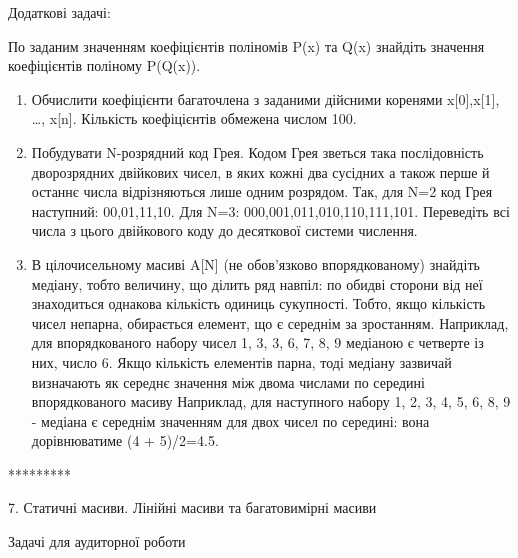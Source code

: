 \documentclass[]{article}
\begin{document}
Додаткові задачі:

По заданим значенням коефіцієнтів поліномів P(x) та Q(x) знайдіть
значення коефіцієнтів поліному P(Q(x)).

\begin{enumerate}
\def\labelenumi{\arabic{enumi})}
\setcounter{enumi}{12}
\item
  Обчислити коефіцієнти багаточлена з заданими дійсними коренями
  x{[}0{]},x{[}1{]}, \ldots{}, x{[}n{]}. Кількість коефіцієнтів обмежена
  числом 100.
\item
  Побудувати N-розрядний код Грея. Кодом Грея зветься така послідовність
  дворозрядних двійкових чисел, в яких кожні два сусідних а також перше
  й останнє числа відрізняються лише одним розрядом. Так, для N=2 код
  Грея наступний: 00,01,11,10. Для N=3: 000,001,011,010,110,111,101.
  Переведіть всі числа з цього двійкового коду до десяткової системи
  числення.
\item
  В цілочисельному масиві A{[}N{]} (не обов'язково впорядкованому)
  знайдіть медіану, тобто величину, що ділить ряд навпіл: по обидві
  сторони від неї знаходиться однакова кількість одиниць сукупності.
  Тобто, якщо кількість чисел непарна, обирається елемент, що є середнім
  за зростанням. Наприклад, для впорядкованого набору чисел 1, 3, 3, 6,
  7, 8, 9 медіаною є четверте із них, число 6. Якщо кількість елементів
  парна, тоді медіану зазвичай визначають як середнє значення між двома
  числами по середині впорядкованого масиву Наприклад, для наступного
  набору 1, 2, 3, 4, 5, 6, 8, 9 - медіана є середнім значенням для двох
  чисел по середині: вона дорівнюватиме (4 + 5)/2=4.5.
\end{enumerate}

*********

7. Статичні масиви. Лінійні масиви та багатовимірні масиви

Задачі для аудиторної роботи
\end{document}
